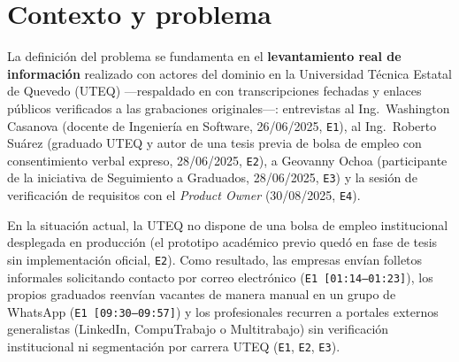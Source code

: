 \documentclass[11pt,a4paper]{article}
\begin{document}
\section{Contexto y problema}

La definición del problema se fundamenta en el \textbf{levantamiento real de información} realizado con actores del dominio en la Universidad Técnica Estatal de Quevedo (UTEQ) ---respaldado en  con transcripciones fechadas y enlaces públicos verificados a las grabaciones originales---: entrevistas al Ing.~Washington Casanova (docente de Ingeniería en Software, 26/06/2025, \texttt{E1}), al Ing.~Roberto Suárez (graduado UTEQ y autor de una tesis previa de bolsa de empleo con consentimiento verbal expreso, 28/06/2025, \texttt{E2}), a Geovanny Ochoa (participante de la iniciativa de Seguimiento a Graduados, 28/06/2025, \texttt{E3}) y la sesión de verificación de requisitos con el \textit{Product Owner} (30/08/2025, \texttt{E4}).

En la situación actual, la UTEQ no dispone de una bolsa de empleo institucional desplegada en producción (el prototipo académico previo quedó en fase de tesis sin implementación oficial, \texttt{E2}). Como resultado, las empresas envían folletos informales solicitando contacto por correo electrónico (\texttt{E1 [01:14--01:23]}), los propios graduados reenvían vacantes de manera manual en un grupo de WhatsApp (\texttt{E1 [09:30--09:57]}) y los profesionales recurren a portales externos generalistas (LinkedIn, CompuTrabajo o Multitrabajo) sin verificación institucional ni segmentación por carrera UTEQ (\texttt{E1}, \texttt{E2}, \texttt{E3}).
\end{document}

